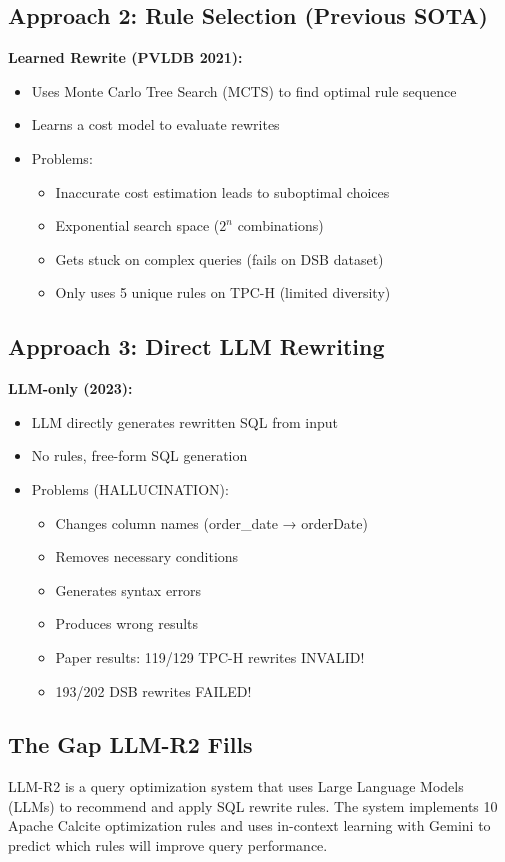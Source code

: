 \documentclass[12pt,a4paper]{article}
\begin{document}
\subsection{Approach 2: Rule Selection (Previous SOTA)}
\textbf{Learned Rewrite (PVLDB 2021):}
\begin{itemize}
    \item Uses Monte Carlo Tree Search (MCTS) to find optimal rule sequence
    \item Learns a cost model to evaluate rewrites
    \item Problems:
    \begin{itemize}
        \item Inaccurate cost estimation leads to suboptimal choices
        \item Exponential search space ($2^n$ combinations)
        \item Gets stuck on complex queries (fails on DSB dataset)
        \item Only uses 5 unique rules on TPC-H (limited diversity)
    \end{itemize}
\end{itemize}

\subsection{Approach 3: Direct LLM Rewriting}
\textbf{LLM-only (2023):}
\begin{itemize}
    \item LLM directly generates rewritten SQL from input
    \item No rules, free-form SQL generation
    \item Problems (HALLUCINATION):
    \begin{itemize}
        \item Changes column names (order\_date → orderDate)
        \item Removes necessary conditions
        \item Generates syntax errors
        \item Produces wrong results
        \item Paper results: 119/129 TPC-H rewrites INVALID!
        \item 193/202 DSB rewrites FAILED!
    \end{itemize}
\end{itemize}

\subsection{The Gap LLM-R2 Fills}
LLM-R2 is a query optimization system that uses Large Language Models (LLMs) to recommend and apply SQL rewrite rules. The system implements 10 Apache Calcite optimization rules and uses in-context learning with Gemini to predict which rules will improve query performance.
\end{document}
